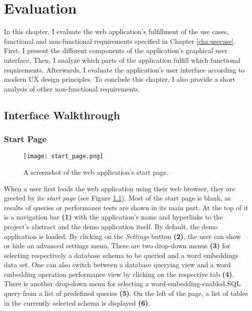 
\chapter{Evaluation}
\label{cha:evaluation}
In this chapter, I evaluate the web application's fulfillment of the use cases, functional and non-functional requirements specified in Chapter \ref{cha:usecase}. First, I present the different components of the application's graphical user interface. Then, I analyze which parts of the application fulfill which functional requirements. Afterwards, I evaluate the application's user interface according to modern UX design principles. To conclude this chapter, I also provide a short analysis of other non-functional requirements.

\section{Interface Walkthrough}
\label{sec:walkthrough}
\subsection{Start Page}
\begin{figure}
	\centering\texttt{[image: start\_page.png]}
	\caption{A screenshot of the web application's start page.}
	\label{fig:start_page_screenshot}
\end{figure}
When a user first loads the web application using their web browser, they are greeted by its \textit{start page} (see Figure \ref{fig:start_page_screenshot}). Most of the start page is blank, as results of queries or performance tests are shown in its main part. At the top of it is a navigation bar \textbf{(1)} with the application's name and hyperlinks to the project's abstract and the demo application itself. By default, the demo application is loaded. By clicking on the \textit{Settings} button \textbf{(2)}, the user can show or hide an advanced settings menu. There are two drop-down menus \textbf{(3)} for selecting respectively a database schema to be queried and a word embeddings data set. One can also switch between a database querying view and a word embedding operation performance view by clicking on the respective tab \textbf{(4)}. There is another drop-down menu for selecting a word-embedding-enabled SQL query from a list of predefined queries \textbf{(5)}. On the left of the page, a list of tables in the currently selected schema is displayed \textbf{(6)}. 

